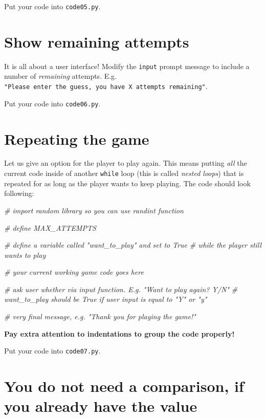 \documentclass[
]{book}
\newenvironment{Shaded}{\begin{snugshade}}{\end{snugshade}}
\newcommand{\CommentTok}[1]{\textcolor[rgb]{0.56,0.35,0.01}{\textit{#1}}}
\begin{document}
Put your code into \texttt{code05.py}.

\hypertarget{show-remaining-attempts}{%
\section{Show remaining attempts}\label{show-remaining-attempts}}

It is all about a user interface! Modify the \texttt{input} prompt message to include a number of \emph{remaining} attempts. E.g. \texttt{"Please\ enter\ the\ guess,\ you\ have\ X\ attempts\ remaining"}.

Put your code into \texttt{code06.py}.

\hypertarget{guess-the-number-repeat-game}{%
\section{Repeating the game}\label{guess-the-number-repeat-game}}

Let us give an option for the player to play again. This means putting \emph{all} the current code inside of another \texttt{while} loop (this is called \emph{nested loops}) that is repeated for as long as the player wants to keep playing. The code should look following:

\begin{Shaded}
\begin{Highlighting}[]
\CommentTok{\# import random library so you can use randint function}

\CommentTok{\# define MAX\_ATTEMPTS}

\CommentTok{\# define a variable called "want\_to\_play" and set to True}
\CommentTok{\# while the player still wants to play}
  
  \CommentTok{\# your current working game code goes here}
  
  \CommentTok{\# ask user whether via input function. E.g. "Want to play again? Y/N"}
  \CommentTok{\# want\_to\_play should be True if user input is equal to "Y" or "y"}
  
\CommentTok{\# very final message, e.g. "Thank you for playing the game!"}
\end{Highlighting}
\end{Shaded}

\textbf{Pay extra attention to indentations to group the code properly!}

Put your code into \texttt{code07.py}.

\hypertarget{you-do-not-need-a-comparison-if-you-already-have-the-value}{%
\section{You do not need a comparison, if you already have the value}\label{you-do-not-need-a-comparison-if-you-already-have-the-value}}
\end{document}
